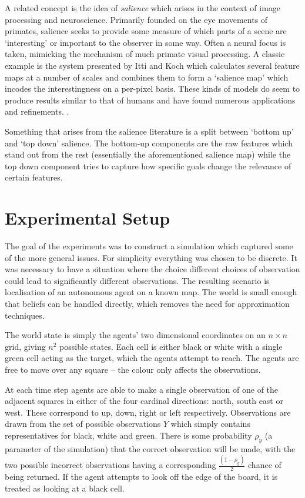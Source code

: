 \documentclass{article}
\begin{document}
A related concept is the idea of \emph{salience} which arises in the context of image
 processing and neuroscience.
Primarily founded on the eye movements of primates, salience seeks to provide some 
measure of which parts of a scene are `interesting' or important to the observer in some
 way. Often a neural focus is taken, mimicking the mechanism of much primate
 visual processing. A classic example is the system presented by Itti and Koch which 
 calculates several feature maps at a number of scales and combines them to form a
 `salience map' which incodes the interestingness on a per-pixel basis.
  \autocite{itti1998salience} 
These kinds of models do seem to produce results similar to that of humans and have found 
numerous applications and refinements.
\autocite{parkhurst2002modeling} .

Something that arises from the salience literature is a split between `bottom up' and 
`top down' salience. The bottom-up components are the raw features which stand out
from the rest (essentially the aforementioned salience map) while the top down component
 tries to capture how specific goals change the relevance of certain features.
 \autocite{wolfe1994guided}

\section{Experimental Setup}
The goal of the experiments was to construct a simulation which captured some of the more
general issues. For simplicity everything was chosen to be discrete. It was necessary to
have a situation where the choice different choices of observation could lead to 
significantly different observations. The resulting scenario is localisation of an
autonomous agent on a known map. The world is small enough that beliefs can be handled
directly, which removes the need for approximation techniques.

The world state is simply the agents' two dimensional coordinates on an \(n \times n\)
grid, giving
\(n^2\) possible states. Each cell is either black or white with a single green
cell acting as the target, which the agents attempt to reach. The agents are free to 
move over any square -- the colour only affects the observations. 

At each time step agents are able to make a single observation of one of the adjacent
squares in either of the four cardinal directions: north, south east or west. These 
correspond to up, down, right or left respectively. Observations are drawn from the 
set of possible observations \(Y\) which simply contains representatives for black, 
white and green. There is some probability \(\rho_y\) (a parameter of the
simulation) that the correct observation will be made, with the two possible incorrect
observations having a corresponding \(\frac{(1-\rho_y)}{2}\) chance of being returned.
If the agent attempts to look off the edge of the board, it is treated as looking at a 
black cell.
\end{document}
